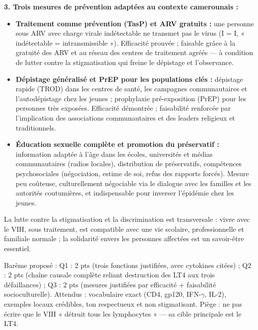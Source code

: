 \documentclass[11pt]{article}
\newcommand{\cle}[1]{{\popxbold\color{popdark}#1}}
\begin{document}
\begin{corrige}
\textbf{3. Trois mesures de prévention adaptées au contexte camerounais :}
\begin{itemize}
    \item \textbf{Traitement comme prévention (TasP) et ARV gratuits :} une personne sous ARV avec charge virale indétectable ne transmet pas le virus (I = I, « indétectable = intransmissible »). Efficacité prouvée ; faisable grâce à la gratuité des ARV et au réseau des centres de traitement agréés — à condition de lutter contre la stigmatisation qui freine le dépistage et l'observance.
    \item \textbf{Dépistage généralisé et PrEP pour les populations clés :} dépistage rapide (TROD) dans les centres de santé, les campagnes communautaires et l'autodépistage chez les jeunes ; prophylaxie pré-exposition (PrEP) pour les personnes très exposées. Efficacité démontrée ; faisabilité renforcée par l'implication des associations communautaires et des leaders religieux et traditionnels.
    \item \textbf{Éducation sexuelle complète et promotion du préservatif :} information adaptée à l'âge dans les écoles, universités et médias communautaires (radios locales), distribution de préservatifs, compétences psychosociales (négociation, estime de soi, refus des rapports forcés). Mesure peu coûteuse, culturellement négociable via le dialogue avec les familles et les autorités coutumières, et indispensable pour inverser l'épidémie chez les jeunes.
\end{itemize}
La lutte contre la \cle{stigmatisation} et la discrimination est transversale : vivre avec le VIH, sous traitement, est compatible avec une vie scolaire, professionnelle et familiale normale ; la solidarité envers les personnes affectées est un savoir-être essentiel.
\end{corrige}

\begin{attention}
Barème proposé : Q1 : 2 pts (trois fonctions justifiées, avec cytokines citées) ; Q2 : 2 pts (chaîne causale complète reliant destruction des LT4 aux trois défaillances) ; Q3 : 2 pts (mesures justifiées par efficacité + faisabilité socioculturelle). Attendus : vocabulaire exact (CD4, gp120, IFN-$\gamma$, IL-2), exemples locaux crédibles, ton respectueux et non stigmatisant. Piège : ne pas écrire que le VIH « détruit tous les lymphocytes » — sa cible principale est le LT4.
\end{attention}
\end{document}

